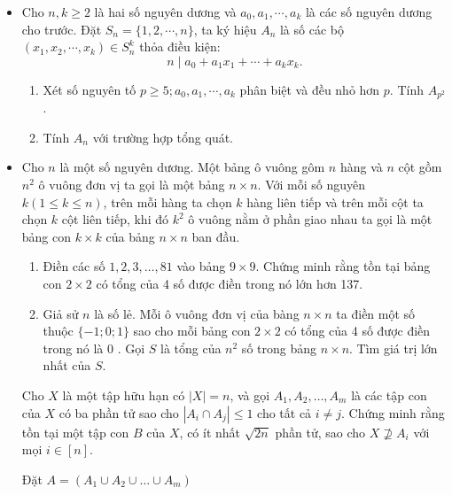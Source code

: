 \documentclass[11pt]{scrartcl}
\begin{document}
\begin{itemize}[label=, leftmargin=0em, itemsep=0.5em]
    \item \begin{btvn}
        Cho $n, k \geq 2$ là hai số nguyên dương và $a_0, a_1, \cdots, a_k$ là các số nguyên dương cho trước. Đặt $S_n=\{1,2, \cdots, n\}$, ta ký hiệu $A_n$ là số các bộ $\left(x_1, x_2, \cdots, x_k\right) \in S_n^k$ thỏa điều kiện:
        $$
        n \mid a_0+a_1 x_1+\cdots+a_k x_k .
        $$
        \begin{enumerate}[label=(\alph*)]
            \item Xét số nguyên tố $p \geq 5 ; a_0, a_1, \cdots, a_k$ phân biệt và đều nhỏ hơn $p$. Tính $A_{p^2}$.
            \item Tính $A_n$ với trường hợp tổng quát.
        \end{enumerate}
    \end{btvn}
    \item \begin{btvn}
        Cho $n$ là một số nguyên dương. Một bảng ô vuông gôm $n$ hàng và $n$ cột gồm $n^2$ ô vuông đơn vị ta gọi là một bảng $n \times n$.
        Với mỗi số nguyên $k(1 \leq k \leq n)$, trên mỗi hàng ta chọn $k$ hàng liên tiếp và trên mỗi cột ta chọn $k$ cột liên tiếp, khi đó $k^2$ ô vuông nằm ở phần giao nhau ta gọi là một bảng con $k \times k$ của bảng $n \times n$ ban đầu.
        \begin{enumerate}[label=(\alph*)]
            \item Điền các số $1,2,3, \ldots, 81$ vào bảng $9 \times 9$. Chứng minh rằng tồn tại bảng con $2 \times 2$ có tổng của 4 số được điền trong nó lớn hơn 137.
            \item Giả sử $n$ là số lẻ. Mỗi ô vuông đơn vị của bàng $n \times n$ ta điền một số thuộc $\{-1 ; 0 ; 1\}$ sao cho mỗi bảng con $2 \times 2$ có tổng của 4 số được điền trong nó là 0 . Gọi $S$ là tổng của $n^2$ số trong bảng $n \times n$. Tìm giá trị lớn nhất của $S$.
        \end{enumerate}
    \end{btvn}
    \begin{bt}
        Cho $X$ là một tập hữu hạn có $|X| = n$, và gọi $A_1, A_2, \dots, A_m$ là các tập con của $X$ có ba phần tử sao cho $|A_i \cap A_j| \le 1$ cho tất cả $i \neq j$. Chứng minh rằng tồn tại một tập con $B$ của $X$, có ít nhất $\sqrt{2n}$ phần tử, sao cho $X \nsupseteq  A_i$ với mọi $i \in [n]$.
    \end{bt}
    \begin{sol}
        Đặt $A = (A_1 \cup A_2 \cup \dots \cup A_m)$

\end{sol}
\end{itemize}
\end{document}
